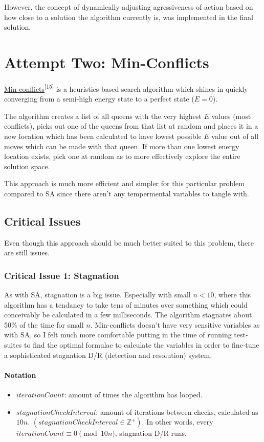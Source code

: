 \documentclass{article}
\begin{document}
However, the concept of dynamically adjusting agressiveness of action based on how close
to a solution the algorithm currently is, was implemented in the final solution.

\section{Attempt Two: Min-Conflicts}
\href{https://en.wikipedia.org/wiki/Min-conflicts_algorithm}{Min-conflicts}\textsuperscript{[15]}
is a heuristics-based search algorithm which shines in quickly converging from a semi-high energy state to a perfect state (\(E = 0\)).

The algorithm creates a list of all queens with the very highest \(E\) values (most conflicts),
picks out one of the queens from that list at random and places it in a new location
which has been calculated to have lowest possible \(E\) value out of all moves which can be made with that queen.
If more than one lowest energy location exists, pick one at random as to more effectively explore the entire solution space.

This approach is much more efficient and simpler for this particular problem compared to SA since there aren't any tempermental variables to tangle with.

\subsection{Critical Issues}
Even though this approach should be much better suited to this problem, there are still issues.

\subsubsection{Critical Issue 1: Stagnation}
As with SA, stagnation is a big issue. Especially with small \(n<10\), where this algorithm has a tendancy to take tens of minutes
over something which could conceivably be calculated in a few milliseconds.
The algorithm stagnates about 50\% of the time for small \(n\).
Min-conflicts doesn't have very sensitive variables as with SA,
so I felt much more comfortable putting in the time of running test-suites to find the optimal formulae to calculate the variables
in order to fine-tune a sophisticated stagnation D/R (detection and resolution) system.

\paragraph{Notation}
\begin{itemize}

    \item \(iterationCount\): amount of times the algorithm has looped.
    \item \(stagnationCheckInterval\): amount of iterations between checks, calculated as \(10n\).
          \newline \((stagnationCheckInterval \in \mathbb{Z}^+)\).
          \newline In other words, every \(iterationCount \equiv 0 \pmod{10n}\), stagnation D/R runs.
\end{itemize}
\end{document}
